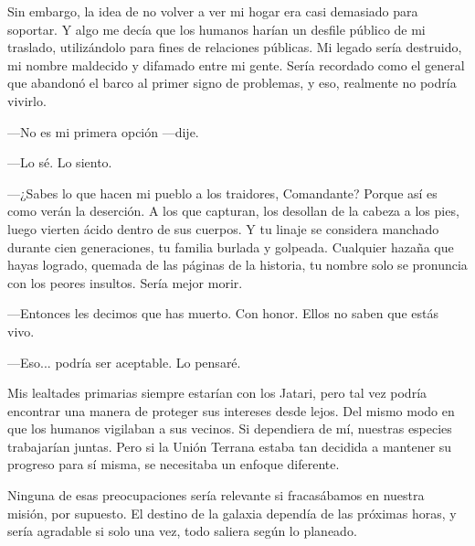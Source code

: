 Sin embargo, la idea de no volver a ver mi hogar era casi demasiado para soportar. Y algo me decía que los humanos harían un desfile público de mi traslado, utilizándolo para fines de relaciones públicas. Mi legado sería destruido, mi nombre maldecido y difamado entre mi gente. Sería recordado como el general que abandonó el barco al primer signo de problemas, y eso, realmente no podría vivirlo.

—No es mi primera opción —dije.

—Lo sé. Lo siento.

—¿Sabes lo que hacen mi pueblo a los traidores, Comandante? Porque así es como verán la deserción. A los que capturan, los desollan de la cabeza a los pies, luego vierten ácido dentro de sus cuerpos. Y tu linaje se considera manchado durante cien generaciones, tu familia burlada y golpeada. Cualquier hazaña que hayas logrado, quemada de las páginas de la historia, tu nombre solo se pronuncia con los peores insultos. Sería mejor morir.

—Entonces les decimos que has muerto. Con honor. Ellos no saben que estás vivo.

—Eso... podría ser aceptable. Lo pensaré.

Mis lealtades primarias siempre estarían con los Jatari, pero tal vez podría encontrar una manera de proteger sus intereses desde lejos. Del mismo modo en que los humanos vigilaban a sus vecinos. Si dependiera de mí, nuestras especies trabajarían juntas. Pero si la Unión Terrana estaba tan decidida a mantener su progreso para sí misma, se necesitaba un enfoque diferente.

Ninguna de esas preocupaciones sería relevante si fracasábamos en nuestra misión, por supuesto. El destino de la galaxia dependía de las próximas horas, y sería agradable si solo una vez, todo saliera según lo planeado.
